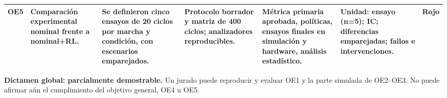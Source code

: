 \documentclass[11pt,letterpaper]{article}
\newcommand{\rojo}{\cellcolor{red!16}\textbf{Rojo}}
\begin{document}
\begin{landscape}
\begin{longtable}{p{1.7cm}p{2.8cm}p{3.5cm}p{4.2cm}p{3.5cm}p{3.5cm}p{1.8cm}}
OE5 & Comparación experimental nominal frente a nominal+RL. & Se definieron cinco ensayos de 20 ciclos por marcha y condición, con escenarios emparejados. & Protocolo borrador y matriz de 400 ciclos; analizadores reproducibles. & Métrica primaria aprobada, políticas, ensayos finales en simulación y hardware, análisis estadístico. & Unidad: ensayo (n=5); IC; diferencias emparejadas; fallos e intervenciones. & \rojo\\
\bottomrule
\end{longtable}
\end{landscape}

\textbf{Dictamen global: parcialmente demostrable.} Un jurado puede reproducir
y evaluar OE1 y la parte simulada de OE2--OE3. No puede afirmar aún el
cumplimiento del objetivo general, OE4 u OE5.

\begin{landscape}

\end{landscape}
\end{document}
